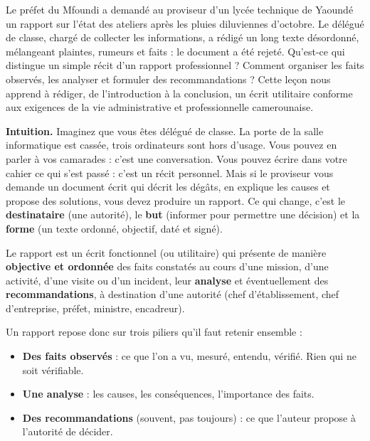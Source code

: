 \documentclass[11pt]{article}
\newcommand{\cle}[1]{{\popxbold\color{popdark}#1}}
\newcounter{popsec}
\newcounter{popsub}
\newcommand{\courssub}[1]{%
  \stepcounter{popsub}%
  \par\vspace{9pt}\noindent{\popxbold\fontsize{11.5}{13}\selectfont\color{popink}{\color{poporange}\thepopsec.\thepopsub}\hspace{6pt}#1}\par\nopagebreak\vspace{4pt}
}
\begin{document}
Le préfet du Mfoundi a demandé au proviseur d'un lycée technique de Yaoundé un rapport sur l'état des ateliers après les pluies diluviennes d'octobre. Le délégué de classe, chargé de collecter les informations, a rédigé un long texte désordonné, mélangeant plaintes, rumeurs et faits : le document a été rejeté. Qu'est-ce qui distingue un simple récit d'un rapport professionnel ? Comment organiser les faits observés, les analyser et formuler des recommandations ? Cette leçon nous apprend à rédiger, de l'introduction à la conclusion, un écrit utilitaire conforme aux exigences de la vie administrative et professionnelle camerounaise.

\courssub{Qu'est-ce qu'un rapport ?}

\textbf{Intuition.} Imaginez que vous êtes délégué de classe. La porte de la salle informatique est cassée, trois ordinateurs sont hors d'usage. Vous pouvez en parler à vos camarades : c'est une conversation. Vous pouvez écrire dans votre cahier ce qui s'est passé : c'est un récit personnel. Mais si le proviseur vous demande un document écrit qui décrit les dégâts, en explique les causes et propose des solutions, vous devez produire un \cle{rapport}. Ce qui change, c'est le \textbf{destinataire} (une autorité), le \textbf{but} (informer pour permettre une décision) et la \textbf{forme} (un texte ordonné, objectif, daté et signé).

\begin{definition}[Le rapport]
Le \cle{rapport} est un écrit fonctionnel (ou utilitaire) qui présente de manière \textbf{objective et ordonnée} des faits constatés au cours d'une mission, d'une activité, d'une visite ou d'un incident, leur \textbf{analyse} et éventuellement des \textbf{recommandations}, à destination d'une autorité (chef d'établissement, chef d'entreprise, préfet, ministre, encadreur).
\end{definition}

Un rapport repose donc sur trois piliers qu'il faut retenir ensemble :

\begin{itemize}
\item \textbf{Des faits observés} : ce que l'on a vu, mesuré, entendu, vérifié. Rien qui ne soit vérifiable.
\item \textbf{Une analyse} : les causes, les conséquences, l'importance des faits.
\item \textbf{Des recommandations} (souvent, pas toujours) : ce que l'auteur propose à l'autorité de décider.
\end{itemize}
\end{document}

